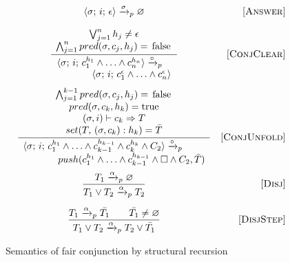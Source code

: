 \begin{figure}[h!]
\[\begin{array}{cr}
      {\inbr{\sigma;\, i;\, \epsilon} \xrightarrow{\sigma}_p \emptyset}  
&     \ruleno{Answer} \\[4mm]
      \dfrac
      {\begin{array}{c}
           \bigvee_{j=1}^n h_j \not= \epsilon \\
           \bigwedge_{j=1}^n pred(\sigma, c_j, h_j) = \mbox{\lstinline{false}}
      \end{array}}
      {\begin{array}{l}
      \inbr{\sigma;\, i;\, c_1^{h_1} \land \ldots \land c_n^{h_n}} \xrightarrow{\circ}_p \\
      \phantom{XXXX} \inbr{\sigma;\, i;\, c_1^\epsilon \land \ldots \land c_n^\epsilon}
      \end{array}}
      &  \ruleno{ConjClear} \\[10mm]
      
      \dfrac
      {
        \begin{array}{c}
          \bigwedge_{j=1}^{k-1} pred(\sigma, c_j, h_j) = \mbox{\lstinline{false}} \\
          pred(\sigma, c_k, h_k) = \mbox{\lstinline{true}} \\
          (\sigma, i) \vdash c_k \Rightarrow T \\
          set(T, \, (\sigma, c_k) : h_k) = \bar{T}
        \end{array}
      }
      {
        \begin{array}{l}
          \inbr{\sigma;\, i;\, c_1^{h_1} \land \ldots \land c_{k-1}^{h_{k-1}} \land c_k^{h_k} \land C_2} \xrightarrow{\circ}_p \\
          \phantom{XXXX}push(c_1^{h_1} \land \ldots \land c_{k-1}^{h_{k-1}} \land \Box \land C_2, \bar{T})
         \end{array}
        }
&     \ruleno{ConjUnfold} \\[10mm]
\dfrac{T_1 \xrightarrow{\alpha}_p \emptyset}
      {T_1 \lor T_2 \xrightarrow{\alpha}_p T_2}
&     \ruleno{Disj} \\[6mm]
\dfrac{T_1 \xrightarrow{\alpha}_p \bar{T_1} \qquad \bar{T_1} \not= \emptyset}
      {T_1 \lor T_2 \xrightarrow{\alpha}_p T_2 \lor\bar{T_1}}
&     \ruleno{DisjStep}
\end{array}\]
\caption{Semantics of fair conjunction by structural recursion}
\label{fair:pred-fair-semantics}
\end{figure}

